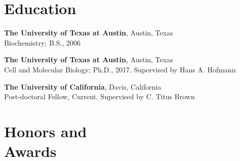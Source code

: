 \documentclass[margin,line]{CV}
\begin{document}
\pagestyle{plain}

\begin{resume}




\section{\mysidestyle Education}

\begin{description}[leftmargin=0pt] 
\setlength{\itemsep}{4pt}
\item[] {\bf The University of Texas at Austin}, Austin, Texas \\Biochemistry; B.S., 2006
\item[] {\bf The University of Texas at Austin}, Austin, Texas \\Cell and Molecular Biology; Ph.D., 2017. Supervised by Hans A. Hofmann
\item[] {\bf The University of California}, Davis, California \\ Post-doctoral Fellow, Current. Supervised by C. Titus Brown
\end{description}
    
 \section{\mysidestyle Honors and \\ Awards} 


\end{resume}
\end{document}
